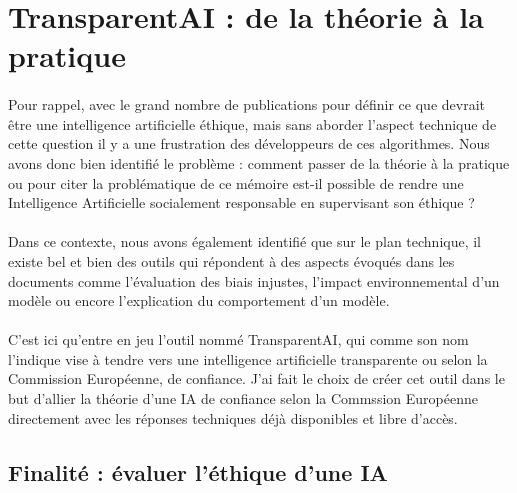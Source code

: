 \documentclass[10pt, french, a4paper]{report}
\begin{document}
\section{TransparentAI : de la théorie à la pratique}
\label{sec:transparentai}

\paragraph{}
Pour rappel, avec le grand nombre de publications pour définir ce que devrait être une intelligence artificielle éthique, mais sans aborder l'aspect technique de cette question il y a une frustration des développeurs de ces algorithmes. Nous avons donc bien identifié le problème : comment passer de la théorie à la pratique ou pour citer la problématique de ce mémoire est-il possible de rendre une Intelligence Artificielle socialement responsable en supervisant son éthique ?

\paragraph{}
Dans ce contexte, nous avons également identifié que sur le plan technique, il existe bel et bien des outils qui répondent à des aspects évoqués dans les documents comme l'évaluation des biais injustes, l'impact environnemental d'un modèle ou encore l'explication du comportement d'un modèle.

\paragraph{}
C'est ici qu'entre en jeu l'outil nommé TransparentAI, qui comme son nom l'indique vise à tendre vers une intelligence artificielle transparente ou selon la Commission Européenne, de confiance. J'ai fait le choix de créer cet outil dans le but d'allier la théorie d'une IA de confiance selon la Commssion Européenne directement avec les réponses techniques déjà disponibles et libre d'accès. 

\subsection{Finalité : évaluer l'éthique d'une IA}
\end{document}
